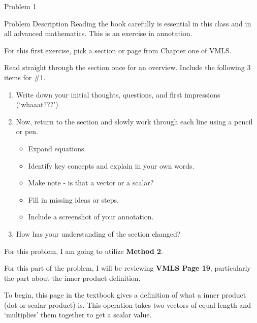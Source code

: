 \begin{problem}{Problem 1}
    \begin{statement}{Problem Description}
        Reading the book carefully is essential in this class and in all advanced mathematics. This is an exercise in annotation.

        For this first exercise, pick a section or page from Chapter one of VMLS. \vspace*{1em}

        Read straight through the section once for an overview. Include the following 3 items for \#1.

        \begin{enumerate}[label=(\alph*)]
            \item Write down your initial thoughts, questions, and first impressions (‘whaaat???’)
            \item Now, return to the section and slowly work through each line using a pencil or pen.
            \begin{itemize}
                \item Expand equations.
                \item Identify key concepts and explain in your own words.
                \item Make note - is that a vector or a scalar?
                \item Fill in missing ideas or steps.
                \item Include a screenshot of your annotation.
            \end{itemize}
            \item How has your understanding of the section changed?
        \end{enumerate}
    \end{statement}

    
    \begin{highlight}
        For this problem, I am going to utilize \textbf{Method 2}. \vspace*{1em}

        For this part of the problem, I will be reviewing \textbf{VMLS Page 19}, particularly the part about the inner product definition.

        To begin, this page in the textbook gives a definition of what a inner product (dot or scalar product) is. This operation takes two vectors of equal length and `multiplies' them together
        to get a scalar value. 
        

\end{highlight}
\end{problem}
